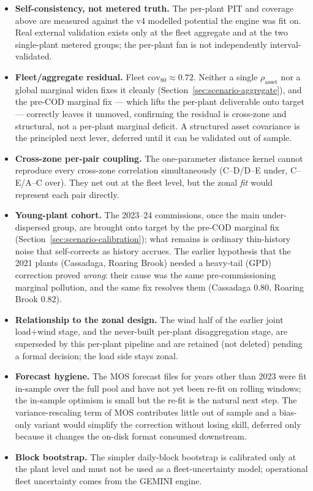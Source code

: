 \documentclass[11pt]{article}
\begin{document}
\begin{itemize}
\item \textbf{Self-consistency, not metered truth.} The per-plant PIT and
  coverage above are measured against the v4 modelled potential the engine
  was fit on. Real external validation exists only at the fleet aggregate
  and at the two single-plant metered groups; the per-plant fan is not
  independently interval-validated.
\item \textbf{Fleet/aggregate residual.} Fleet $\mathrm{cov}_{80}\approx0.72$.
  Neither a single $\rho_{\mathrm{asset}}$ nor a global marginal widen
  fixes it cleanly (Section~\ref{sec:scenario-aggregate}), and the pre-COD
  marginal fix --- which lifts the per-plant deliverable onto target ---
  correctly leaves it unmoved, confirming the residual is cross-zone and
  structural, not a per-plant marginal deficit. A structured asset
  covariance is the principled next lever, deferred until it can be
  validated out of sample.
\item \textbf{Cross-zone per-pair coupling.} The one-parameter distance
  kernel cannot reproduce every cross-zone correlation simultaneously
  (C--D/D--E under, C--E/A--C over). They net out at the fleet level, but
  the zonal \emph{fit} would represent each pair directly.
\item \textbf{Young-plant cohort.} The 2023--24 commissions, once the main
  under-dispersed group, are brought onto target by the pre-COD marginal
  fix (Section~\ref{sec:scenario-calibration}); what remains is ordinary
  thin-history noise that self-corrects as history accrues. The earlier
  hypothesis that the 2021 plants (Cassadaga, Roaring Brook) needed a
  heavy-tail (GPD) correction proved \emph{wrong}: their cause was the same
  pre-commissioning marginal pollution, and the same fix resolves them
  (Cassadaga $0.80$, Roaring Brook $0.82$).
\item \textbf{Relationship to the zonal design.} The wind half of the
  earlier joint load+wind stage, and the never-built per-plant
  disaggregation stage, are superseded by this per-plant pipeline and are
  retained (not deleted) pending a formal decision; the load side stays
  zonal.
\item \textbf{Forecast hygiene.} The MOS forecast files for years other
  than 2023 were fit in-sample over the full pool and have not yet been
  re-fit on rolling windows; the in-sample optimism is small but the
  re-fit is the natural next step. The variance-rescaling term of MOS
  contributes little out of sample and a bias-only variant would simplify
  the correction without losing skill, deferred only because it changes
  the on-disk format consumed downstream.
\item \textbf{Block bootstrap.} The simpler daily-block bootstrap is
  calibrated only at the plant level and must not be used as a
  fleet-uncertainty model; operational fleet uncertainty comes from the
  GEMINI engine.
\end{itemize}
\end{document}
